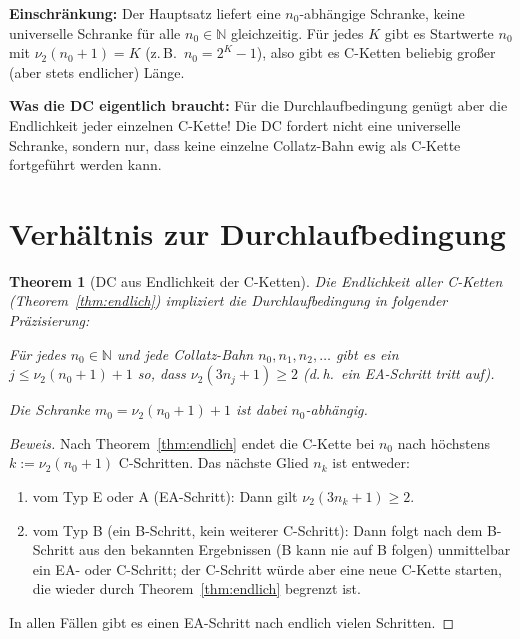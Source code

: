 \documentclass[12pt,a4paper]{article}
\newtheorem{theorem}[definition]{Theorem}
\newenvironment{beweis}{\begin{proof}[Beweis]}{\end{proof}}
\newcommand{\vii}{\nu_2}
\newcommand{\N}{\mathbb{N}}
\begin{document}
\begin{tcolorbox}[warnung]
\textbf{Einschränkung:} Der Hauptsatz liefert eine $n_0$-abhängige Schranke,
keine universelle Schranke für alle $n_0 \in \N$ gleichzeitig. Für jedes $K$
gibt es Startwerte $n_0$ mit $\vii(n_0+1) = K$ (z.\,B.\ $n_0 = 2^K - 1$),
also gibt es C-Ketten beliebig großer (aber stets endlicher) Länge.

\textbf{Was die DC eigentlich braucht:} Für die Durchlaufbedingung genügt
aber die Endlichkeit jeder einzelnen C-Kette! Die DC fordert nicht eine
universelle Schranke, sondern nur, dass keine einzelne Collatz-Bahn ewig
als C-Kette fortgeführt werden kann.
\end{tcolorbox}

\section{Verhältnis zur Durchlaufbedingung}

\begin{theorem}[DC aus Endlichkeit der C-Ketten]
\label{thm:dc}
Die Endlichkeit aller C-Ketten (Theorem~\ref{thm:endlich}) impliziert die
Durchlaufbedingung in folgender Präzisierung:

Für jedes $n_0 \in \N$ und jede Collatz-Bahn $n_0, n_1, n_2, \ldots$
gibt es ein $j \leq \vii(n_0 + 1) + 1$ so, dass $\vii(3n_j+1) \geq 2$
(d.\,h.\ ein EA-Schritt tritt auf).

Die Schranke $m_0 = \vii(n_0+1) + 1$ ist dabei $n_0$-abhängig.
\end{theorem}

\begin{beweis}
Nach Theorem~\ref{thm:endlich} endet die C-Kette bei $n_0$ nach höchstens
$k := \vii(n_0+1)$ C-Schritten. Das nächste Glied $n_k$ ist entweder:
\begin{enumerate}[label=(\alph*)]
  \item vom Typ E oder A (EA-Schritt): Dann gilt $\vii(3n_k+1) \geq 2$. \checkmark
  \item vom Typ B (ein B-Schritt, kein weiterer C-Schritt): Dann folgt nach
    dem B-Schritt aus den bekannten Ergebnissen (B kann nie auf B folgen)
    unmittelbar ein EA- oder C-Schritt; der C-Schritt würde aber eine
    neue C-Kette starten, die wieder durch Theorem~\ref{thm:endlich}
    begrenzt ist.
\end{enumerate}
In allen Fällen gibt es einen EA-Schritt nach endlich vielen Schritten.
\end{beweis}
\end{document}
